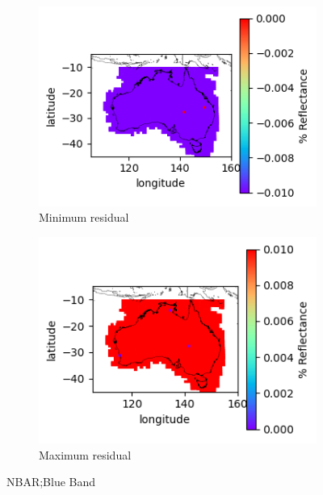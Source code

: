 \documentclass[a4paper]{article}
\begin{document}
      \begin{figure}[h!]
        \centering
          \begin{subfigure}[l]{.4\linewidth}
            \hspace{-32mm}
            \includegraphics[scale=0.9]{plots/nbar/nbar_blue-MinResidual.png}
            \caption{Minimum residual}
          \end{subfigure}
%
          \begin{subfigure}[r]{.4\linewidth}
            \includegraphics[scale=0.9]{plots/nbar/nbar_blue-MaxResidual.png}
            \caption{Maximum residual}
          \end{subfigure}
        \caption{NBAR;\@ Blue Band}\label{figure:4}
      \end{figure}

  \clearpage
\end{document}
